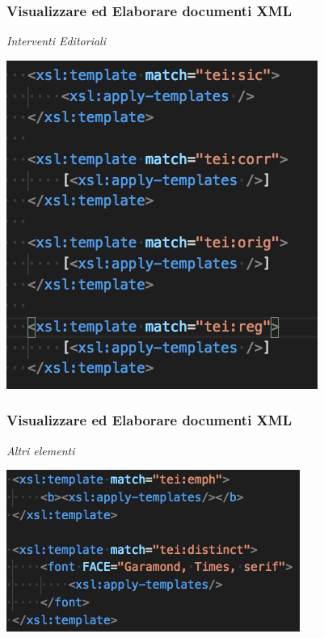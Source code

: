 \begin{frame}
    \frametitle{Visualizzare ed Elaborare documenti XML}
    \addtocounter{nframe}{1}
    
        \textit{Interventi Editoriali}

    \begin{center}
        \includegraphics[width=.8\textwidth]{imgs/EsempioCommentato8.png}
    \end{center}

\end{frame}

\begin{frame}
    \frametitle{Visualizzare ed Elaborare documenti XML}
    \addtocounter{nframe}{1}
    
        \textit{Altri elementi}

    \begin{center}
        \includegraphics[width=.8\textwidth]{imgs/EsempioCommentato9.png}
    \end{center}

\end{frame}

